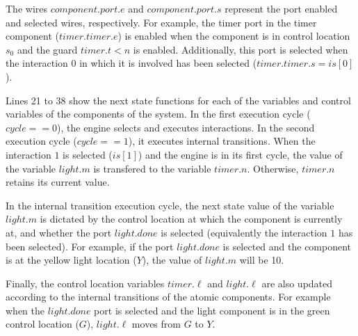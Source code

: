 The wires $component.port.e$ and $component.port.s$ represent the 
port enabled and selected wires, respectively. 
For example, the timer port 
in the timer component ($timer.timer.e$) is enabled when the 
component is in control location $s_0$ and the guard $timer.t < n$ is
enabled. Additionally, this port is selected when the interaction $0$ 
in which it is involved has been selected ($timer.timer.s = is[0]$).

Lines 21 to 38 show the next state functions for each of the variables
and control variables of the components of the system. 
In the first execution cycle ($cycle == 0$), 
the engine selects and executes interactions.
In the second execution cycle ($cycle == 1$), 
it executes internal transitions. 
When the interaction $1$ is selected ($is[1]$) and the engine is 
in its first cycle, the value of the variable $light.m$ is transfered
to the variable $timer.n$. Otherwise, $timer.n$ retains its current
value.

In the internal transition execution cycle, the next state value of
the variable $light.m$ is dictated by the control location at which the component is currently at, and whether the port $light.done$
is selected (equivalently the interaction $1$ has been selected).
For example, if the port $light.done$ is selected and the component 
is at the yellow light location ($Y$), the value of
$light.m$ will be 10. 

Finally, the control location variables $timer.\ell$ and 
$light.\ell$ are also updated according to the internal transitions of the 
atomic components. For example when the $light.done$ port is selected
and the light component is in the green control location ($G$), 
 $light.\ell$ moves from $G$ to $Y$. 

